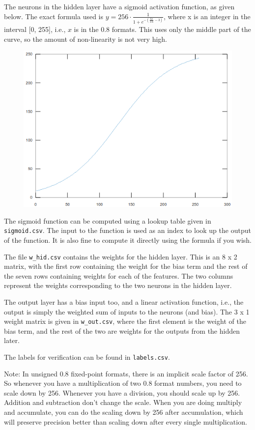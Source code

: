 \documentclass[a4paper,12pt,twoside]{article}
\begin{document}
The neurons in the hidden layer have a sigmoid activation function, as given below. The exact formula used is  $y=256\cdot\frac{1}{1+e^{-\left(\frac{6x}{256}-3\right)}}$, where x is an integer in the interval [0, 255], i.e., $x$ is in the 0.8 formats. This uses only the middle part of the curve, so the amount of non-linearity is not very high.
\begin{figure}[H]
    \centering
    \includegraphics[width=\textwidth]{images/11.png}
\end{figure}
The sigmoid function can be computed using a lookup table given in \texttt{sigmoid.csv}. The input to the function is used as an index to look up the output of the function. It is also fine to compute it directly using the formula if you wish.

The file \texttt{w\_hid.csv} contains the weights for the hidden layer. This is an 8 x 2 matrix, with the first row containing the weight for the bias term and the rest of the seven rows containing weights for each of the features. The two columns represent the weights corresponding to the two neurons in the hidden layer.

The output layer has a bias input too, and a linear activation function, i.e., the output is simply the weighted sum of inputs to the neurons (and bias). The 3 x 1 weight matrix is given in \texttt{w\_out.csv}, where the first element is the weight of the bias term, and the rest of the two are weights for the outputs from the hidden later.

The labels for verification can be found in \texttt{labels.csv}.

Note: In unsigned 0.8 fixed-point formats, there is an implicit scale factor of 256. So whenever you have a multiplication of two 0.8 format numbers, you need to scale down by 256. Whenever you have a division, you should scale up by 256. Addition and subtraction don't change the scale. When you are doing multiply and accumulate, you can do the scaling down by 256 after accumulation, which will preserve precision better than scaling down after every single multiplication.
\end{document}
